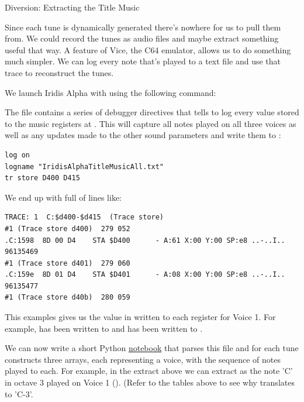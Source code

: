\begin{tcolorbox}[%
  breakable,
  parbox = false,
  frame hidden,
  sharp corners,
  after skip=10pt,
  overlay broken = {
    \draw[]
      (frame.north west) rectangle (frame.south east);},
]{}
Diversion: Extracting the Title Music

Since each tune is dynamically generated there's nowhere for us to pull them from. We could record
the tunes as audio files and maybe extract something useful that way. A feature of Vice, the C64
emulator, allows us to do something much simpler. We can log every note that's played to a 
text file and use that trace to reconstruct the tunes.

We launch Iridis Alpha with  using the following command:


The  file contains a series of debugger directives that tells 
to log every value stored to the music registers at . This will capture
all notes played on all three voices as well as any updates made to the other sound parameters
and write them to :

\begin{lstlisting}
log on
logname "IridisAlphaTitleMusicAll.txt"
tr store D400 D415
\end{lstlisting}

We end up with  full of lines like:

\begin{lstlisting}[basicstyle=\tiny]
TRACE: 1  C:$d400-$d415  (Trace store)
#1 (Trace store d400)  279 052
.C:1598  8D 00 D4    STA $D400      - A:61 X:00 Y:00 SP:e8 ..-..I..   96135469
#1 (Trace store d401)  279 060
.C:159e  8D 01 D4    STA $D401      - A:08 X:00 Y:00 SP:e8 ..-..I..   96135477
#1 (Trace store d40b)  280 059
\end{lstlisting}

This examples gives us the value in  written to each register for Voice 1. For example, 
has been written to  and  has been written to .

We can now write a short Python \href{https://github.com/mwenge/iatheory/tree/main/notebooks}{notebook} that
parses this file and for each tune constructs three arrays, each representing a voice, with the sequence
of notes played to each. For example, in the extract above we can extract  as the note 'C'
in octave 3 played on Voice 1 (). (Refer to the tables above to see why 
translates to 'C-3'.


\end{tcolorbox}
